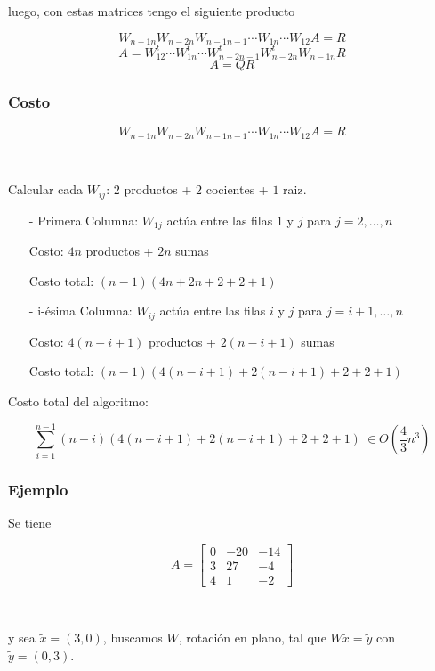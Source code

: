 luego, con estas matrices tengo el siguiente producto

\[W_{n-1n}W_{n-2n}W_{n-1n-1}\cdots W_{1n}\cdots W_{12}A = R\]
\[A = W_{12}^{t}\cdots W_{1n}^{t}\cdots W_{n-2n-1}^{t}W_{n-2n}^{t}W_{n-1n}R\]
\[A = QR\]

\subsubsection{Costo}\label{subsubsec:givens_costo}

\[W_{n-1n}W_{n-2n}W_{n-1n-1}\cdots W_{1n}\cdots W_{12}A = R\]

\

\noindent Calcular cada $W_{ij}$: $2$ productos + $2$ cocientes + $1$ raiz.

\begin{itemize}
    \item[-] Primera Columna:
             $W_{1j}$ actúa entre las filas $1$ y $j$ para $j = 2,\ldots,n$

             Costo: $4n$ productos + $2n$ sumas
              
             Costo total: $(n-1)(4n + 2n + 2 + 2 + 1)$
    \item[-] i-ésima Columna:
             $W_{ij}$ actúa entre las filas $i$ y $j$ para $j = i+1,\ldots,n$

             Costo: $4(n-i+1)$ productos + $2(n -i +1)$ sumas

             Costo total: $(n-1)(4(n - i + 1) + 2(n - i + 1) + 2 + 2 + 1)$
\end{itemize}

\noindent Costo total del algoritmo:

\[\sum_{i=1}^{n-1}(n-i)(4(n - i + 1) + 2(n - i + 1) + 2 + 2 + 1) ~\in O(\frac{4}{3}n^3)\]

\newpage

\subsubsection{Ejemplo}\label{subsubsec:givens_ejemplo}

Se tiene

\[
A = 
\begin{bmatrix}
     0 & -20 & -14 \\
     3 & 27 & -4 \\
     4 & 1 & -2
\end{bmatrix}
\]

\

y sea $\tilde{x} = (3,0)$, buscamos $W$, rotación en plano, tal que $W\tilde{x} = \tilde{y}$ con $\tilde{y} = (0,3)$.

